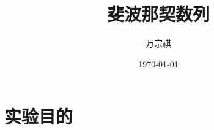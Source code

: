\documentclass[UTF8]{ctexart}
\title{斐波那契数列}
\author{万宗祺}
\date{\today}
\begin{document}
\maketitle
\tableofcontents
\section{实验目的}
\end{document}
